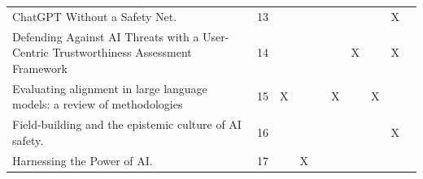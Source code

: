 \begin{landscape}
\begin{longtable}{|p{14cm}|c|c|c|c|c|c|c|c|c|}
		ChatGPT Without a Safety Net.                                                                                                                           & 13          &                                    &                                                           &                                                       &                                                            &                                           &                                              & X                                                  &                                    \\
		Defending Against AI Threats with a User-Centric Trustworthiness Assessment Framework                                                                   & 14          &                                    &                                                           &                                                       &                                                            & X                                         &                                              & X                                                  &                                    \\
		Evaluating alignment in large language models: a review of methodologies                                                                                & 15          & X                                  &                                                           &                                                       & X                                                          &                                           & X                                            &                                                    &                                    \\
		Field-building and the epistemic culture of AI safety.                                                                                                  & 16          &                                    &                                                           &                                                       &                                                            &                                           &                                              & X                                                  &                                    \\
		Harnessing the Power of AI.                                                                                                                             & 17          &                                    & X                                                         &                                                       &                                                            &                                           &                                              &                                                    &                                    \\

\end{longtable}
\end{landscape}
